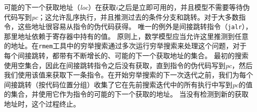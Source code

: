 \begin{commentary}

  可能的下一个获取地址（{\it loc}）在获取$i$之后是立即可用的，并且模型不需要等待伪代码写到{\em pc}；这允许乱序执行，并且推测过去的条件分支和跳转。对于大多数指令，这些地址很容易从指令的伪代码获得。
  唯一的例外是间接跳转指令（{\tt jalr}），那里地址依赖于寄存器中持有的值。
  原则上，数学模型应当允许这里推测到任意的地址。在{\tt rmem}工具中的穷举搜索通过多次运行穷举搜索来处理这个问题，对于每个间接跳转，都带有不断增长的、可能的下一个获取地址的集合。
  最初的搜索使用空集合，因此在间接跳转指令之后没有获取，直到指令的伪代码写到{\em pc}，然后我们使用该值来获取下一条指令。在开始穷举搜索的下一次迭代之前，我们为每个间接跳转（按代码位置分组）收集了它在先前搜索迭代中的所有执行中写到{\em pc}的值的集合，并使用它作为指令的可能的下一个获取的地址。
  当没有检测到新的获取地址时，这个过程终止。
\end{commentary}

